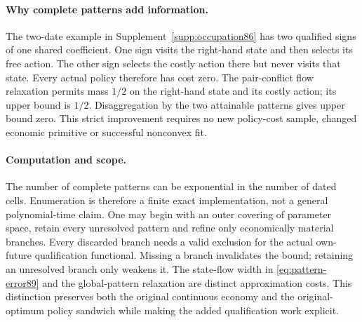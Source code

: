 \paragraph{Why complete patterns add information.}
The two-date example in Supplement~\ref{supp:occupation86} has two qualified signs of one shared coefficient. One sign visits the right-hand state and then selects its free action. The other sign selects the costly action there but never visits that state. Every actual policy therefore has cost zero. The pair-conflict flow relaxation permits mass $1/2$ on the right-hand state and its costly action; its upper bound is $1/2$. Disaggregation by the two attainable patterns gives upper bound zero. This strict improvement requires no new policy-cost sample, changed economic primitive or successful nonconvex fit.

\paragraph{Computation and scope.}
The number of complete patterns can be exponential in the number of dated cells. Enumeration is therefore a finite exact implementation, not a general polynomial-time claim. One may begin with an outer covering of parameter space, retain every unresolved pattern and refine only economically material branches. Every discarded branch needs a valid exclusion for the actual own-future qualification functional. Missing a branch invalidates the bound; retaining an unresolved branch only weakens it. The state-flow width in \eqref{eq:pattern-error89} and the global-pattern relaxation are distinct approximation costs. This distinction preserves both the original continuous economy and the original-optimum policy sandwich while making the added qualification work explicit.
